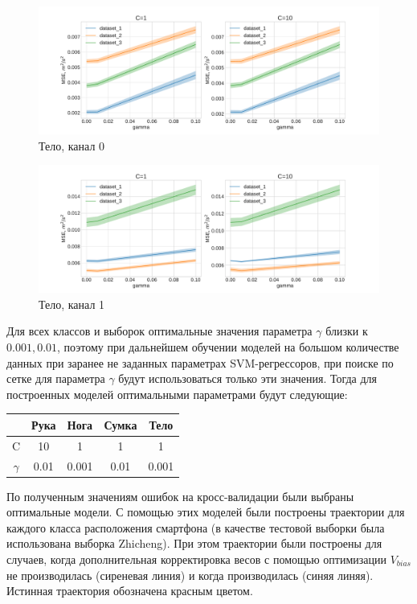 \documentclass[12pt,twoside]{article}
\begin{document}
    \begin{figure}[H]
    \includegraphics[scale=0.4]{charts/body_chn0_C=10.pdf}
    \caption{Тело, канал 0}
    \label{fig:image}
    \end{figure}
    
    \begin{figure}[H]
    \includegraphics[scale=0.4]{charts/body_chn1_C=10.pdf}
    \caption{Тело, канал 1}
    \label{fig:image}
    \end{figure}
    
Для всех классов и выборок оптимальные значения параметра $\gamma$ близки к $0.001, 0.01$, поэтому при дальнейшем обучении моделей на большом количестве данных при заранее не заданных параметрах SVM-регрессоров, при поиске по сетке для параметра $\gamma$ будут использоваться только эти значения. Тогда для построенных моделей оптимальными параметрами будут следующие:

\begin{table}[H]
\begin{center}
\begin{tabular}{|c|c|c|c|c|}
\hline
& Рука & Нога & Сумка & Тело \\
\hline
C & 10 & 1 & 1 & 1 \\
\hline
$\gamma$ & 0.01 & 0.001 & 0.01 & 0.001\\
\hline
\end{tabular}
\end{center}
\end{table} 
    
По полученным значениям ошибок на кросс-валидации были выбраны оптимальные модели. С помощью этих моделей были построены траектории для каждого класса расположения смартфона (в качестве тестовой выборки была использована выборка Zhicheng). При этом траектории были построены для случаев, когда дополнительная корректировка весов с помощью оптимизации $V_{bias}$ не производилась (сиреневая линия) и когда производилась (синяя линяя). Истинная траектория обозначена красным цветом.
\end{document}
